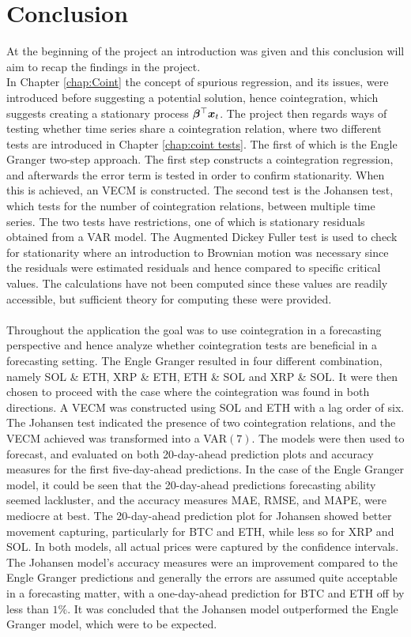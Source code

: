 \chapter{Conclusion}
At the beginning of the project an introduction was given and this conclusion will aim to recap the findings in the project.\\
In Chapter \ref{chap:Coint} the concept of spurious regression, and its issues, were introduced before suggesting a potential solution, hence cointegration, which suggests creating a stationary process $\boldsymbol{\beta}^\top\boldsymbol{x}_t$. The project then regards ways of testing whether time series share a cointegration relation, where two different tests are introduced in Chapter \ref{chap:coint tests}. The first of which is the Engle Granger two-step approach. The first step constructs a cointegration regression, and afterwards the error term is tested in order to confirm stationarity. When this is achieved, an VECM is constructed. The second test is the Johansen test, which tests for the number of cointegration relations, between multiple time series. The two tests have restrictions, one of which is stationary residuals obtained from a VAR model. The Augmented Dickey Fuller test is used to check for stationarity where an introduction to Brownian motion was necessary since the residuals were estimated residuals and hence compared to specific critical values. The calculations have not been computed since these values are readily accessible, but sufficient theory for computing these were provided. \\\\
Throughout the application the goal was to use cointegration in a forecasting perspective and hence analyze whether cointegration tests are beneficial in a forecasting setting. The Engle Granger resulted in four different combination, namely SOL \& ETH, XRP \& ETH, ETH \& SOL and XRP \& SOL. It were then chosen to proceed with the case where the cointegration was found in both directions. A VECM was constructed using SOL and ETH with a lag order of six. The Johansen test indicated the presence of two cointegration relations, and the VECM achieved was transformed into a VAR$(7)$. The models were then used to forecast, and evaluated on both 20-day-ahead prediction plots and accuracy measures for the first five-day-ahead predictions. In the case of the Engle Granger model, it could be seen that the 20-day-ahead predictions forecasting ability seemed lackluster, and the accuracy measures MAE, RMSE, and MAPE, were mediocre at best. The 20-day-ahead prediction plot for Johansen showed better movement capturing, particularly for BTC and ETH, while less so for XRP and SOL. In both models, all actual prices were captured by the confidence intervals. The Johansen model's accuracy measures were an improvement compared to the Engle Granger predictions and generally the errors are assumed quite acceptable in a forecasting matter, with a one-day-ahead prediction for BTC and ETH off by less than $1\%$. It was concluded that the Johansen model outperformed the Engle Granger model, which were to be expected.

